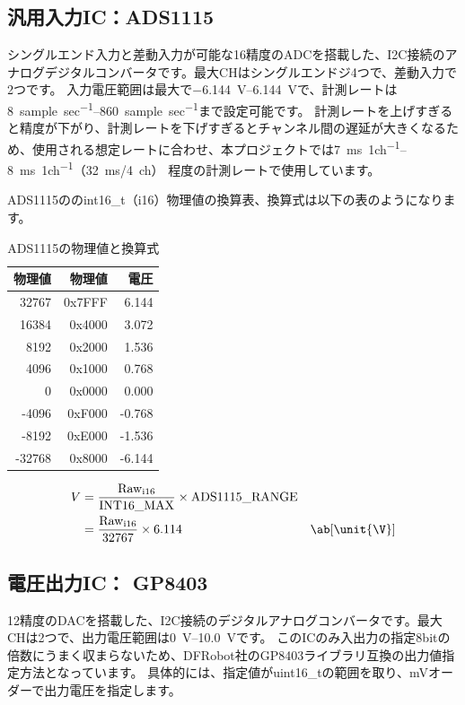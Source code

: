 \subsection{汎用入力IC：ADS1115}
シングルエンド入力と差動入力が可能な\qty{16}{\bit}精度のADCを搭載した、I2C接続のアナログデジタルコンバータです。最大CHはシングルエンドジ4つで、差動入力で2つです。
入力電圧範囲は最大で\qtyrange[print-implicit-plus]{-6.144}{+6.144}{\V}で、計測レートは\qtyrange{8}{860}{sample\per sec}まで設定可能です。
計測レートを上げすぎると精度が下がり、計測レートを下げすぎるとチャンネル間の遅延が大きくなるため、使用される想定レートに合わせ、本プロジェクトでは\qtyrange{7}{8}{\ms\per 1ch}（\qty{32}{\ms}/\qty{4}{ch}） 程度の計測レートで使用しています。

ADS1115ののint16\_t（i16）物理値の換算表、換算式は以下の表のようになります。

\begin{table}[htbp]
    \centering
    \caption{ADS1115の物理値と換算式}
    \begin{tabular}{rrr}
        \toprule
        物理値 & 物理値  & 電圧 \\ \midrule
        32767  & 0x7FFF &  6.144 \\
        16384  & 0x4000 &  3.072 \\
        8192   & 0x2000 &  1.536 \\
        4096   & 0x1000 &  0.768 \\
        0      & 0x0000 &  0.000 \\
        -4096  & 0xF000 & -0.768 \\
        -8192  & 0xE000 & -1.536 \\
        -32768 & 0x8000 & -6.144 \\ \bottomrule
    \end{tabular}
    \label{tab:ads1115_data}
\end{table}

\begin{align}
    V   &= \frac{\mathrm{Raw}_\mathrm{i16}}{\mathrm{INT16\_MAX}} \times \mathrm{ADS1115\_RANGE} & \\
        &= \frac{\mathrm{Raw}_\mathrm{i16}}{32767} \times 6.114 & \ab[\unit{\V}]
\end{align}

\subsection{電圧出力IC： GP8403}
\qty{12}{\bit}精度のDACを搭載した、I2C接続のデジタルアナログコンバータです。最大CHは2つで、出力電圧範囲は\qtyrange{0}{10.0}{\V}です。
このICのみ入出力の指定8bitの倍数にうまく収まらないため、DFRobot社のGP8403ライブラリ互換の出力値指定方法となっています。
具体的には、指定値がuint16\_tの範囲を取り、\unit{\mV}オーダーで出力電圧を指定します。

